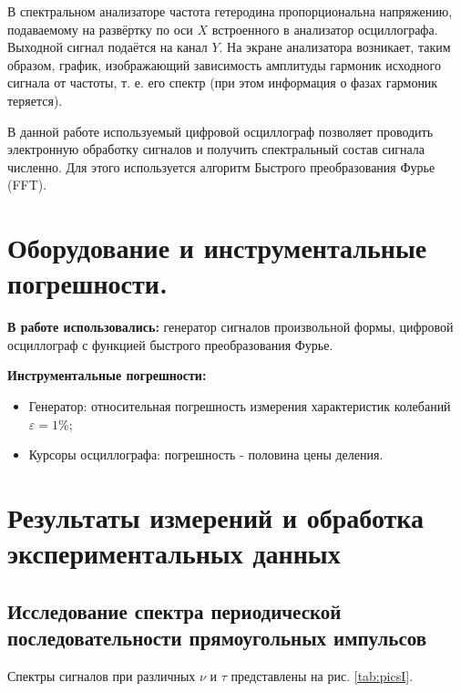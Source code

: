 \documentclass[a4paper,12pt]{article} %
\begin{document}
В спектральном анализаторе частота гетеродина пропорциональна напряжению, подаваемому на развёртку по оси $X$ встроенного в анализатор осциллографа. Выходной сигнал подаётся на канал $Y$. На экране анализатора возникает, таким образом, график, изображающий зависимость амплитуды гармоник исходного сигнала от частоты, т. е. его спектр (при этом информация о фазах гармоник теряется).

В данной работе используемый цифровой осциллограф позволяет проводить электронную обработку сигналов и получить спектральный состав сигнала численно. Для этого используется алгоритм Быстрого преобразования Фурье (FFT).

\section{Оборудование и инструментальные погрешности.}

\textbf{В работе использовались:} генератор сигналов произвольной формы, цифровой осциллограф с функцией быстрого преобразования Фурье.

\textbf{Инструментальные погрешности:}

\begin{itemize}
    \item Генератор: относительная погрешность измерения характеристик колебаний $\varepsilon = 1 \%$;
    \item Курсоры осциллографа: погрешность - половина цены деления.
\end{itemize}

\section{Результаты измерений и обработка экспериментальных данных}

\subsection{Исследование спектра периодической последовательности прямоугольных импульсов}

Спектры сигналов при различных $\nu$ и $\tau$ представлены на рис. \ref{tab:picsI}.
\end{document}
